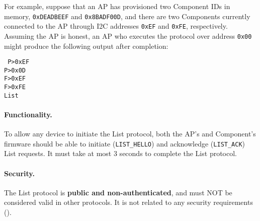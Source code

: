 For example, suppose that an AP has provisioned two Component IDs in memory, \texttt{0xDEADBEEF} and \texttt{0x8BADF00D}, and there are two Components currently connected to the AP through I2C addresses \texttt{0xEF} and \texttt{0xFE}, respectively. Assuming the AP is honest, an AP who executes the protocol over address \texttt{0x00} might produce the following output after completion:

\texttt{%
P>0xEF\\
P>0x0D\\
F>0xEF\\
F>0xFE\\
List
}
\fi
\begin{pcimage}
\end{pcimage}

\paragraph{Functionality.} To allow any device to initiate the List protocol, both the AP's and Component's firmware should be able to initiate (\texttt{LIST\_HELLO}) and acknowledge (\texttt{LIST\_ACK}) List requests. It must take at most 3 seconds to complete the List protocol.

\paragraph{Security.} The List protocol is \textbf{public and non-authenticated}, and must NOT be considered valid in other protocols. It is not related to any security requirements ().
